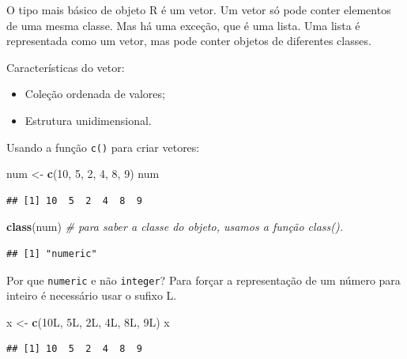 \documentclass[]{book}
\newenvironment{Shaded}{\begin{snugshade}}{\end{snugshade}}
\newcommand{\CommentTok}[1]{\textcolor[rgb]{0.56,0.35,0.01}{\textit{#1}}}
\newcommand{\DecValTok}[1]{\textcolor[rgb]{0.00,0.00,0.81}{#1}}
\newcommand{\KeywordTok}[1]{\textcolor[rgb]{0.13,0.29,0.53}{\textbf{#1}}}
\newcommand{\NormalTok}[1]{#1}
\newcommand{\StringTok}[1]{\textcolor[rgb]{0.31,0.60,0.02}{#1}}
\begin{document}
O tipo mais básico de objeto R é um vetor. Um vetor só pode conter elementos de uma mesma classe. Mas há uma exceção, que é uma lista. Uma lista é representada como um vetor, mas pode conter objetos de diferentes classes.

Características do vetor:

\begin{itemize}
\item
  Coleção ordenada de valores;
\item
  Estrutura unidimensional.
\end{itemize}

Usando a função \texttt{c()} para criar vetores:

\begin{Shaded}
\begin{Highlighting}[]
\NormalTok{num <-}\StringTok{ }\KeywordTok{c}\NormalTok{(}\DecValTok{10}\NormalTok{, }\DecValTok{5}\NormalTok{, }\DecValTok{2}\NormalTok{, }\DecValTok{4}\NormalTok{, }\DecValTok{8}\NormalTok{, }\DecValTok{9}\NormalTok{)}
\NormalTok{num}
\end{Highlighting}
\end{Shaded}

\begin{verbatim}
## [1] 10  5  2  4  8  9
\end{verbatim}

\begin{Shaded}
\begin{Highlighting}[]
\KeywordTok{class}\NormalTok{(num) }\CommentTok{# para saber a classe do objeto, usamos a função class().}
\end{Highlighting}
\end{Shaded}

\begin{verbatim}
## [1] "numeric"
\end{verbatim}

Por que \texttt{numeric} e não \texttt{integer}? Para forçar a representação de um número para inteiro é necessário usar o sufixo L.

\begin{Shaded}
\begin{Highlighting}[]
\NormalTok{x <-}\StringTok{ }\KeywordTok{c}\NormalTok{(10L, 5L, 2L, 4L, 8L, 9L)}
\NormalTok{x}
\end{Highlighting}
\end{Shaded}

\begin{verbatim}
## [1] 10  5  2  4  8  9
\end{verbatim}
\end{document}
